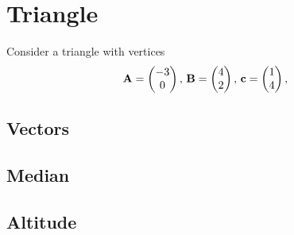 \documentclass[11pt]{book}
\begin{document}
\frontmatter
\tableofcontents
\setcounter{page}{0}
\mainmatter
\chapter{Triangle}
Consider a triangle with vertices
\begin{align}
\label{eq:tri-pts}
\vec{A}=\myvec{-3 \\ 0},\,
\vec{B}=\myvec{4\\2},\,
	\vec{c}=\myvec{1\\4},\,
\end{align}

\section{Vectors}
\section{Median}
\section{Altitude}
\end{document}
